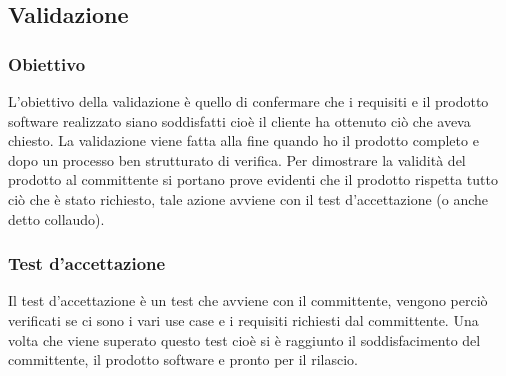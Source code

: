 \subsection{Validazione}
\subsubsection{Obiettivo}
L’obiettivo della validazione è quello di confermare che i requisiti e il prodotto software realizzato siano soddisfatti cioè il cliente ha ottenuto ciò che aveva chiesto. La validazione viene fatta alla fine quando ho il prodotto completo e dopo un processo ben strutturato di verifica. Per dimostrare la validità del prodotto al committente si portano prove evidenti che il prodotto rispetta tutto ciò che è stato richiesto, tale azione avviene con il test d’accettazione (o anche detto collaudo).

\subsubsection{Test d’accettazione} 
Il test d’accettazione è un test che avviene con il committente, vengono perciò verificati se ci sono i vari use case e i requisiti richiesti dal committente. Una volta che viene superato questo test cioè si è raggiunto il soddisfacimento del committente, il prodotto software e pronto per il rilascio.